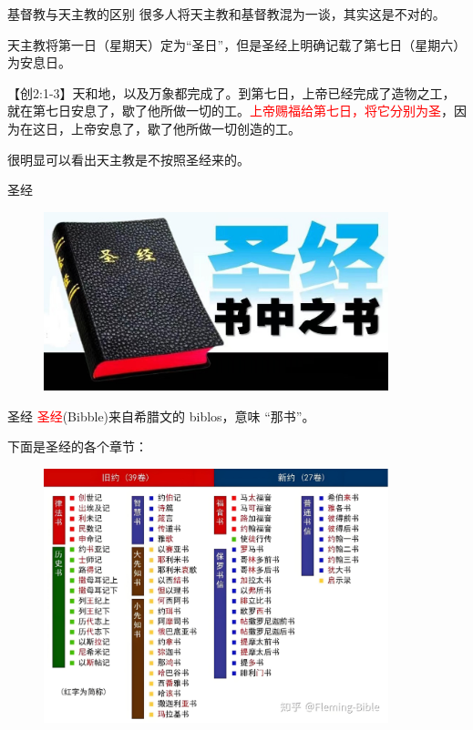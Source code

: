 \documentclass[UTF8]{ctexbeamer}
\begin{document}
	\begin{frame}
		\titlepage
	\end{frame}
	\begin{frame}{基督教与天主教的区别}
		很多人将天主教和基督教混为一谈，其实这是不对的。\par\pause
		
		天主教将第一日（星期天）定为“圣日”，但是圣经上明确记载了第七日（星期六）为安息日。\par\pause
		
		【创2:1-3】天和地，以及万象都完成了。到第七日，上帝已经完成了造物之工，就在第七日安息了，歇了他所做一切的工。\textcolor{red}{上帝赐福给第七日，将它分别为圣}，因为在这日，上帝安息了，歇了他所做一切创造的工。\par\pause
		
		很明显可以看出天主教是不按照圣经来的。
		
	\end{frame}
	\begin{frame}{圣经}
		\begin{figure}[H]
			\centering
			\includegraphics[width=10cm]{picture/4.png}
		\end{figure}
	\end{frame}
	\begin{frame}{圣经}
		\textcolor{red}{圣经}(Bibble)来自希腊文的 biblos，意味 “那书”。\par\pause
		下面是圣经的各个章节：
		\begin{figure}[H]
			\centering
			\includegraphics[width=10cm]{picture/5.png}
		\end{figure}
	\end{frame}
\end{document}
